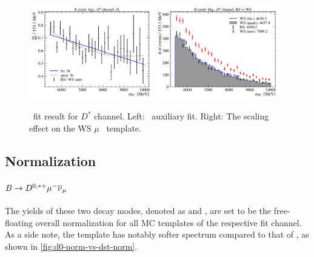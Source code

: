 \begin{figure}[!htb]
    \centering
    \includegraphics[width=0.48\textwidth]{figs-fit-fit-templates/data-driven-plots/b_comb/fit_b_comb_d0_fit.pdf}
    \includegraphics[width=0.48\textwidth]{figs-fit-fit-templates/data-driven-plots/b_comb/fit_b_comb_d0_scaled.pdf}

    \caption{
        \BComb\ fit result for $D^*$ channel.
        Left: \BComb\ auxiliary fit.
        Right: The scaling effect on the WS $\mu$ \BComb\ template.
    }
    \label{fig:b-comb-d0}
\end{figure}


\subsection{Normalization}
\label{tmpl:norm}

\paragraph{$B \rightarrow D^{0,*+}{\mu^-}{{\overline{\nu}}_\mu}$}
The yields of these two decay modes,
denoted as \fitNDmu and \fitNmu,
are set to be the free-floating overall normalization for all MC templates of
the respective fit channel.
As a side note,
the \Dz\muon template has notably softer \qSq spectrum compared to
that of \Dstarp\muon,
as shown in \cref{fig:d0-norm-vs-dst-norm}.

